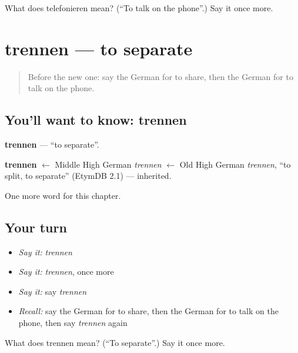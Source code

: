 \begin{tcolorbox}[breakable,colback=teal!4,colframe=teal!35!black,title={Before you move on}]
What does telefonieren mean? (\textquotedblleft{}To talk on the phone\textquotedblright{}.) Say it once more.
\end{tcolorbox}
\section[trennen]{trennen — to separate}

\label{lesson:GE-C188-trennen}



\begin{quote}
Before the new one: say the German for to share, then the German for to talk on the phone.
\end{quote}

\subsection*{You'll want to know: trennen}
\textbf{trennen} — \textquotedblleft{}to separate\textquotedblright{}.

\begin{cousinweb}
\textbf{trennen} $\leftarrow$ Middle High German \emph{trennen} $\leftarrow$ Old High German \emph{trennen}, \textquotedblleft{}to split, to separate\textquotedblright{} (EtymDB 2.1) — inherited.
\end{cousinweb}

\begin{grammarlens}[title={What you've built}]
One more word for this chapter.
\end{grammarlens}

\subsection*{Your turn}
\begin{itemize}
\raggedright
  \item \emph{Say it:} \emph{trennen}
  \item \emph{Say it:} \emph{trennen}, once more
  \item \emph{Say it:} say \emph{trennen}
  \item \emph{Recall:} say the German for to share, then the German for to talk on the phone, then say \emph{trennen} again
\end{itemize}

\begin{tcolorbox}[breakable,colback=teal!4,colframe=teal!35!black,title={Before you move on}]
What does trennen mean? (\textquotedblleft{}To separate\textquotedblright{}.) Say it once more.
\end{tcolorbox}
